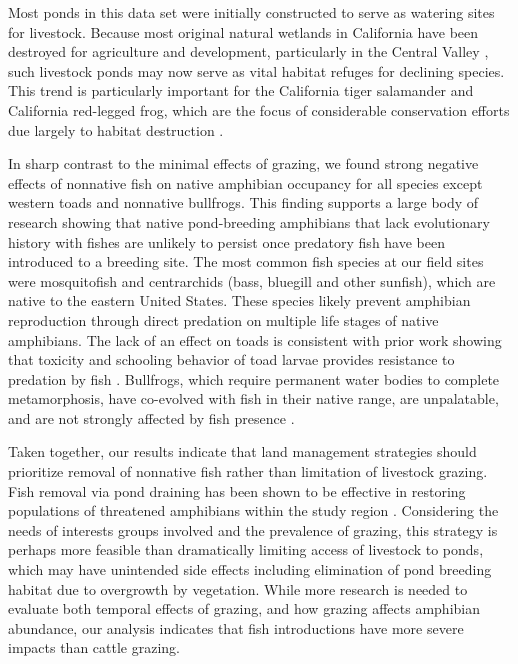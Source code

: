 Most ponds in this data set were initially constructed to serve as
watering sites for livestock. Because most original natural wetlands in
California have been destroyed for agriculture and development,
particularly in the Central Valley \citep{Garone2011}, such livestock ponds
may now serve as vital habitat refuges for declining species. This trend
is particularly important for the California tiger salamander and
California red-legged frog, which are the focus of considerable
conservation efforts due largely to habitat destruction \citep{lannoo2005}.

In sharp contrast to the minimal effects of grazing, we found strong
negative effects of nonnative fish on native amphibian occupancy for all
species except western toads and nonnative bullfrogs. This finding
supports a large body of research showing that native pond-breeding
amphibians that lack evolutionary history with fishes are unlikely to
persist once predatory fish have been introduced to a breeding site. The
most common fish species at our field sites were mosquitofish and
centrarchids (bass, bluegill and other sunfish), which are native to the
eastern United States. These species likely prevent amphibian
reproduction through direct predation on multiple life stages of native
amphibians. The lack of an effect on toads is consistent with prior work
showing that toxicity and schooling behavior of toad larvae provides
resistance to predation by fish \citep{Kruse1984, Welsh2006b}.
Bullfrogs, which require permanent water bodies to complete
metamorphosis, have co-evolved with fish in their native range, are
unpalatable, and are not strongly affected by fish presence \citep{walters1975, Kruse1977, Szuroczki2011}.

Taken together, our results indicate that land management strategies
should prioritize removal of nonnative fish rather than limitation of
livestock grazing. Fish removal via pond draining has been shown to be
effective in restoring populations of threatened amphibians within the
study region \citep{Alvarez2003}. Considering the needs of interests
groups involved and the prevalence of grazing, this strategy is perhaps
more feasible than dramatically limiting access of livestock to ponds,
which may have unintended side effects including elimination of pond
breeding habitat due to overgrowth by vegetation. While more research is
needed to evaluate both temporal effects of grazing, and how grazing
affects amphibian abundance, our analysis indicates that fish
introductions have more severe impacts than cattle grazing.

